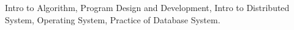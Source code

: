 

\begin{cvparagraph}
Intro to Algorithm, Program Design and Development, Intro to Distributed System, 
Operating System, Practice of Database System.
\end{cvparagraph}

